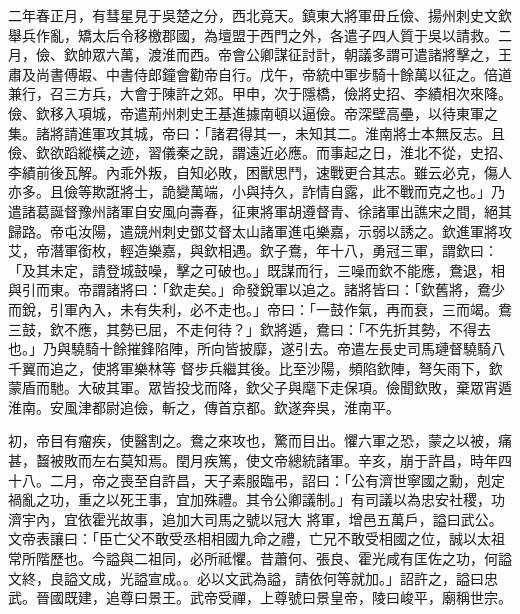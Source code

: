 \begin{pinyinscope}
 二年春正月，有彗星見于吳楚之分，西北竟天。鎮東大將軍毌丘儉、揚州刺史文欽舉兵作亂，矯太后令移檄郡國，為壇盟于西門之外，各遣子四人質于吳以請救。二月，儉、欽帥眾六萬，渡淮而西。帝會公卿謀征討計，朝議多謂可遣諸將擊之，王肅及尚書傅嘏、中書侍郎鐘會勸帝自行。戊午，帝統中軍步騎十餘萬以征之。倍道
 兼行，召三方兵，大會于陳許之郊。甲申，次于隱橋，儉將史招、李績相次來降。儉、欽移入項城，帝遣荊州刺史王基進據南頓以逼儉。帝深壁高壘，以待東軍之集。諸將請進軍攻其城，帝曰：「諸君得其一，未知其二。淮南將士本無反志。且儉、欽欲蹈縱橫之迹，習儀秦之說，謂遠近必應。而事起之日，淮北不從，史招、李績前後瓦解。內乖外叛，自知必敗，困獸思鬥，速戰更合其志。雖云必克，傷人亦多。且儉等欺誑將士，詭變萬端，小與持久，詐情自露，此不戰而克之也。」乃遣諸葛誕督豫州諸軍自安風向壽春，征東將軍胡遵督青、徐諸軍出譙宋之間，絕其
 歸路。帝屯汝陽，遣競州刺史鄧艾督太山諸軍進屯樂嘉，示弱以誘之。欽進軍將攻艾，帝潛軍銜枚，輕造樂嘉，與欽相遇。欽子鴦，年十八，勇冠三軍，謂欽曰：「及其未定，請登城鼓噪，擊之可破也。」既謀而行，三噪而欽不能應，鴦退，相與引而東。帝謂諸將曰：「欽走矣。」命發銳軍以追之。諸將皆曰：「欽舊將，鴦少而銳，引軍內入，未有失利，必不走也。」帝曰：「一鼓作氣，再而衰，三而竭。鴦三鼓，欽不應，其勢已屈，不走何待？」欽將遁，鴦曰：「不先折其勢，不得去也。」乃與驍騎十餘摧鋒陷陣，所向皆披靡，遂引去。帝遣左長史司馬璉督驍騎八千翼而追之，使將軍樂林等
 督步兵繼其後。比至沙陽，頻陷欽陣，弩矢雨下，欽蒙盾而馳。大破其軍。眾皆投戈而降，欽父子與麾下走保項。儉聞欽敗，棄眾宵遁淮南。安風津都尉追儉，斬之，傳首京都。欽遂奔吳，淮南平。



 初，帝目有瘤疾，使醫割之。鴦之來攻也，驚而目出。懼六軍之恐，蒙之以被，痛甚，齧被敗而左右莫知焉。閏月疾篤，使文帝總統諸軍。辛亥，崩于許昌，時年四十八。二月，帝之喪至自許昌，天子素服臨弔，詔曰：「公有濟世寧國之勳，剋定禍亂之功，重之以死王事，宜加殊禮。其令公卿議制。」有司議以為忠安社稷，功濟宇內，宜依霍光故事，追加大司馬之號以冠大
 將軍，增邑五萬戶，謚曰武公。文帝表讓曰：「臣亡父不敢受丞相相國九命之禮，亡兄不敢受相國之位，誠以太祖常所階歷也。今謚與二祖同，必所祗懼。昔蕭何、張良、霍光咸有匡佐之功，何謚文終，良謚文成，光謚宣成。。必以文武為謚，請依何等就加。」詔許之，謚曰忠武。晉國既建，追尊曰景王。武帝受禪，上尊號曰景皇帝，陵曰峻平，廟稱世宗。




\end{pinyinscope}
